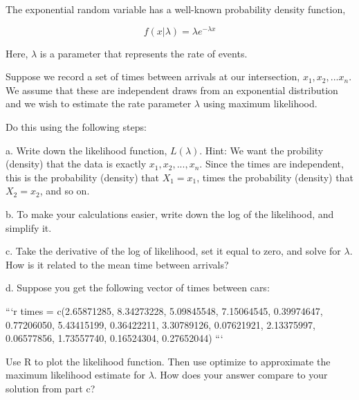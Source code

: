 \documentclass[12pt,a4paper]{article}
\numberwithin{equation}{subsection}
\begin{document}
\begin{enumerate}
The exponential random variable has a well-known probability density function,

$$ f(x|\lambda) = \lambda e^{-\lambda x} $$

Here, $\lambda$ is a parameter that represents the rate of events.

Suppose we record a set of times between arrivals at our intersection, $x_1, x_2, ... x_n$.  We assume that these are independent draws from an exponential distribution and we wish to estimate the rate parameter $\lambda$ using maximum likelihood.

Do this using the following steps:

a. Write down the likelihood function, $L(\lambda)$.  Hint: We want the probility (density) that the data is exactly $x_1, x_2,...,x_n$.  Since the times are independent, this is the probability (density) that $X_1 = x_1$, times the probability (density) that $X_2 = x_2$, and so on.

b. To make your calculations easier, write down the log of the likelihood, and simplify it.

c. Take the derivative of the log of likelihood, set it equal to zero, and solve for $\lambda$.  How is it related to the mean time between arrivals?

d. Suppose you get the following vector of times between cars:

```{r}
times = c(2.65871285, 8.34273228, 5.09845548, 7.15064545,
          0.39974647, 0.77206050, 5.43415199, 0.36422211,
          3.30789126, 0.07621921, 2.13375997, 0.06577856,
          1.73557740, 0.16524304, 0.27652044)
```

Use R to plot the likelihood function.   Then use optimize to approximate the maximum likelihood estimate for $\lambda$.  How does your answer compare to your solution from part c?
\end{enumerate}
\end{document}
